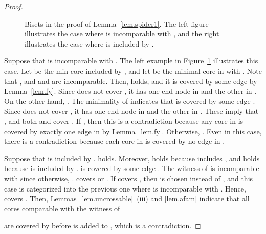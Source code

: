 \documentclass[11pt]{article}
\begin{document}
\begin{proof}
\begin{figure}[th]
  \caption{Bisets in the proof of Lemma~\ref{lem.spider1}. The left
  figure illustrates the case where  is incomparable with
  , and
  the right illustrates the case where  is included by .}
  \label{fig.spider1}
 \end{figure}

 Suppose that  is incomparable with .
 The left example in Figure~\ref{fig.spider1} illustrates this case.
 Let  be the min-core included by ,
 and let  be the minimal core in  with
 .
 Note that , and
  and  are incomparable.
 Then,  holds, and 
 it is covered by some edge  by Lemma~\ref{lem.fy}.
 Since  does not cover , it has one end-node in  and the other in .
 On the other hand, .
 The minimality of  indicates that 
 is covered by some edge .
 Since  does not cover ,
 it has one end-node in  and the other in .
 These imply that , and both  and  cover .
 If , then this is a contradiction because
 any core in 
 is covered by exactly one edge in  by Lemma~\ref{lem.fy}.
 Otherwise, .
 Even in this case, there is a contradiction because each core in  is covered by no edge in .

 Suppose that  is included by .
  holds.
 Moreover,  holds
 because  includes , 
 and  holds
 because  is included by .
  is covered by some edge .
 The witness of  is incomparable with 
 since otherwise, .
  covers  or .
 If  covers ,
 then  is chosen instead of , and this case is categorized into
 the previous one where  is incomparable with .
 Hence,  covers . Then,
 Lemmas~\ref{lem.uncrossable}~(iii) and \ref{lem.afam} indicate that
 all cores comparable with the witness of
  
 are covered by  before  is added to ,
 which is
 a contradiction.
\end{proof}
\end{document}

